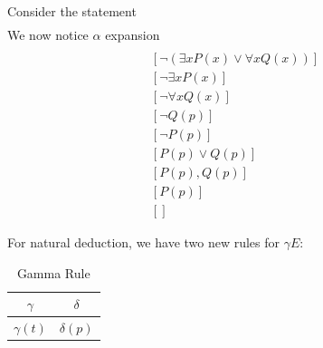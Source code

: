 \documentclass[a4paper]{article}
\theoremstyle{plain}
\theoremstyle{definition}
\newtheorem{defn}{Definition}[section]
\newtheorem{exmp}{Example}[section]
\theoremstyle{remark}
\begin{document}
\begin{tcolorbox}[colback=black!3!white,colframe=black!60!white,title=\begin{exmp}Resolution \label{Resolution}\end{exmp}]
        Consider the statement
                \begin{align}
                [\neg(\phi := \forall x(P(x) \lor Q(x)) \to  (\exists x P(x) \lor \forallx Q(x)))]
                \end{align}
		We now notice $\alpha$ expansion
		\begin{align}
			[\forall x (P(x) \lor Q(x))]\\
			[\neg (\exists x P(x) \lor \forall x Q(x))] \\
			[ \neg \exists  x P(x) ] \\
			[\neg \forall x Q(x) ] \\
			[\neg Q (p)] \\
			[\neg P(p)] \\
			[P(p) \lor Q(p) ] \\
			[P(p), Q(p)]  \\
			[P(p)] \\
			[]
		\end{align}
\end{tcolorbox}
\begin{tcolorbox}[colback=black!3!white,colframe=black!60!white,title=\begin{defn}Natural Deduction \label{Natural Deduction}\end{defn}]
For natural deduction, we have two new rules for $\gamma E$:
\begin{table}[H]
	\centering
	\caption{Gamma Rule}
	\label{tab:label}
	\begin{tabular}{c|c}
		$\gamma$ & $\delta$ \\
		\hline
		$\gamma(t)$ & $\delta(p)$
	\end{tabular}
\end{table}
\end{tcolorbox}
\end{document}
